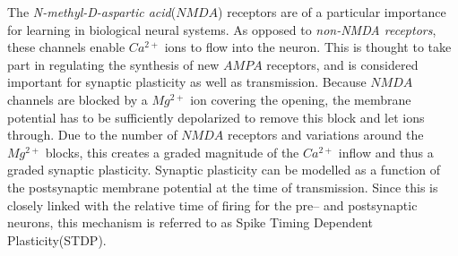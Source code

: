 		The \emph{N-methyl-D-aspartic acid}($NMDA$) receptors are of a particular importance for learning in biological neural systems\cite{OmNMDAsekvenserForSynPlast}. 
		As opposed to \emph{non-NMDA receptors}, these channels enable $Ca^{2+}$ ions to flow into the neuron.
 		This is thought to take part in regulating the synthesis of new $AMPA$ receptors, and is considered important for synaptic plasticity as well as transmission\cite{AMPARtrafficingArtikkel}.
		Because $NMDA$ channels are blocked by a $Mg^{2+}$ ion covering the opening, the membrane potential has to be sufficiently depolarized to remove this block and let ions through\cite{PrinciplesOfNeuralScience4edKAP63}.
  		Due to the number of $NMDA$ receptors and variations around the $Mg^{2+}$ blocks, this creates a graded magnitude of the $Ca^{2+}$ inflow and thus a graded synaptic plasticity. %
		Synaptic plasticity can be modelled as a function of the postsynaptic membrane potential at the time of transmission\cite{PrinciplesOfNeuralScience4edKAP63, reviewSTDP, NEVR3003STDP}.
		Since this is closely linked with the relative time of firing for the pre-- and postsynaptic neurons, this mechanism is referred to as Spike Timing Dependent Plasticity(STDP).
 




